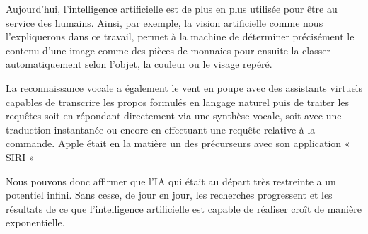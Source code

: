 Aujourd’hui, l’intelligence artificielle est de plus en plus utilisée pour être au service des humains. Ainsi, par exemple, la vision artificielle comme nous l’expliquerons dans ce travail, permet à la machine de déterminer précisément le contenu d'une image comme des pièces de monnaies pour ensuite la classer automatiquement selon l'objet, la couleur ou le visage repéré. 

La reconnaissance vocale a également le vent en poupe avec des assistants virtuels capables de transcrire les propos formulés en langage naturel puis de traiter les requêtes soit en répondant directement via une synthèse vocale, soit avec une traduction instantanée ou encore en effectuant une requête relative à la commande. Apple était en la matière un des précurseurs avec son application « SIRI »

Nous pouvons donc affirmer que l’IA qui était au départ très restreinte a un potentiel infini. 
Sans cesse, de jour en jour, les recherches progressent et les résultats de ce que l’intelligence artificielle est capable de réaliser croît de manière exponentielle.




